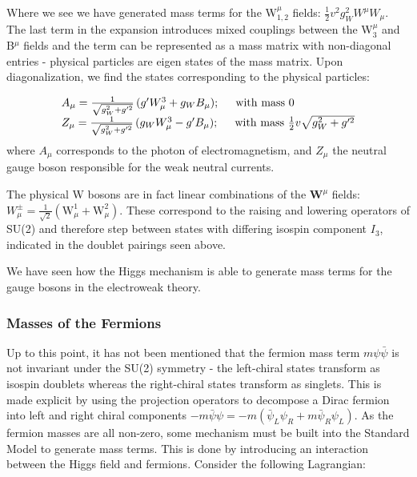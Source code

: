 Where we see we have generated mass terms for the W$^{\mu}_{1,2}$ fields: $\frac{1}{2} v^{2} g_{W}^{2} W^{\mu}W_{\mu}$. The last term in the expansion introduces mixed couplings between the W$_{3}^{\mu}$ and B$^{\mu}$ fields and the term can be represented as a mass matrix with non-diagonal entries - physical particles are eigen states of the mass matrix. Upon diagonalization, we find the states corresponding to the physical particles:

\begin{equation}
\begin{array}{l}
A_{\mu} = \frac{1}{\sqrt{g_{W}^{2} + g'^{2}}} \, (g' W^{3}_{\mu} + g_{W}B_{\mu});\hspace{0.5cm} \mathrm{with\,\,mass}\,\,0\\
Z_{\mu} = \frac{1}{\sqrt{g_{W}^{2} + g'^{2}}} \, (g_{W} W^{3}_{\mu} - g'B_{\mu}); \hspace{0.5cm} \mathrm{with\,\,mass}\,\, \frac{1}{2}v\sqrt{g_{W}^{2} + g'^{2}}
\end{array}
\end{equation}
where $A_{\mu}$ corresponds to the photon of electromagnetism, and $Z_{\mu}$ the neutral gauge boson responsible for the weak neutral currents.

The physical W bosons are in fact linear combinations of the $\mathrm{\bm{W}}^{\mu}$ fields: $W^{\pm}_{\mu}= \frac{1}{\sqrt{2}}(\mathrm{W}^{1}_{\mu} + \mathrm{W}^{2}_{\mu})$. These correspond to the raising and lowering operators of SU(2) and therefore step between states with differing isospin component $I_{3}$, indicated in the doublet pairings seen above.

We have seen how the Higgs mechanism is able to generate mass terms for the gauge bosons in the electroweak theory.

\subsubsection{Masses of the Fermions}

Up to this point, it has not been mentioned that the fermion mass term $m\psi\bar{\psi}$ is not invariant under the SU(2) symmetry - the left-chiral states transform as isospin doublets whereas the right-chiral states transform as singlets. This is made explicit by using the projection operators to decompose a Dirac fermion into left and right chiral components $-m\bar{\psi}\psi = -m(\bar{\psi}_{L}\psi_{R} + m\bar{\psi}_{R}\psi_{L})$. As the fermion masses are all non-zero, some mechanism must be built into the Standard Model to generate mass terms. This is done by introducing an interaction between the Higgs field and fermions. Consider the following Lagrangian:

